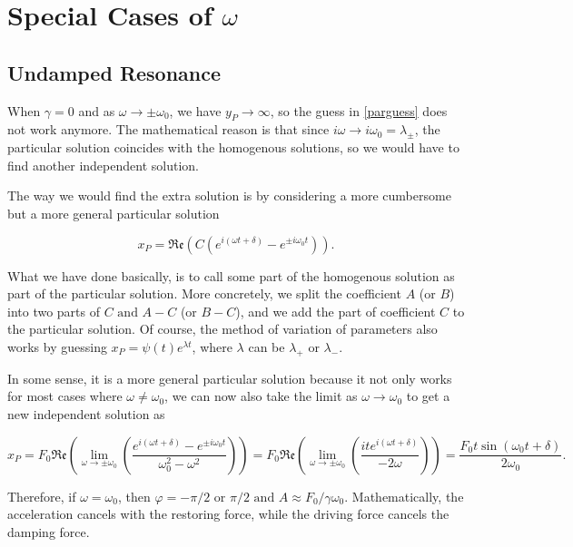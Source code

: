 \documentclass[english,a4paper,12pt]{report}
\begin{document}
\section{Special Cases of \(\omega \) }

\subsection{Undamped Resonance}

When \(\gamma = 0\) and as \(\omega \to \pm \omega _{0}\), we have \(y_{P} \to \infty  \), so the guess in \cref{parguess} does not work anymore. The mathematical reason is that since \(i \omega \to  i \omega _{0} = \lambda _{\pm } \), the particular solution coincides with the homogenous solutions, so we would have to find another independent solution. 

The way we would find the extra solution is by considering a more cumbersome but a more general particular solution 

\begin{equation}
    x_{P} =  \mathfrak{Re} (C(e^{i(\omega t+\delta )} - e^{\pm i\omega _{0}t  } ) ). 
\end{equation}

What we have done basically, is to call some part of the homogenous solution as part of the particular solution. More concretely, we split the coefficient \(A \) (or \(B\)) into two parts of \(C \text { and } A-C\) (or \(B-C\)), and we add the part of coefficient \(C\) to the particular solution. Of course, the method of variation of parameters also works by guessing \(x_{P} = \psi (t)e^{\lambda t}\), where \(\lambda \) can be \(\lambda _{+} \text { or } \lambda _{-}  \).

In some sense, it is a more general particular solution because it not only works for most cases where \(\omega \neq \omega _{0} \), we can now also take the limit as \(\omega \to \omega _{0} \) to get a new independent solution as   


\begin{equation}
    x_{P} = F_0 \mathfrak{Re} \left( \lim_{\omega  \to \pm \omega _{0}  } \left(  \frac{e^{i (\omega t+\delta )} - e^{\pm i \omega _{0}  t }  }{\omega _{0}^2-\omega ^2 } \right)\right) = F_0 \mathfrak{Re} \left( \lim_{\omega  \to \pm \omega _{0} } \left(\frac{ite^{i (\omega t+\delta )} }{-2\omega } \right) \right)= \frac{F_0 t \sin (\omega _{0}t +\delta )}{2 \omega _{0} }.
\end{equation}

Therefore, if \(\omega = \omega _{0} \), then \( \varphi = - \pi /2 \text { or } \pi /2 \text { and } A\approx F_0 /\gamma \omega _{0}   \). Mathematically, the acceleration cancels with the restoring force, while the driving force cancels the damping force.
\end{document}

